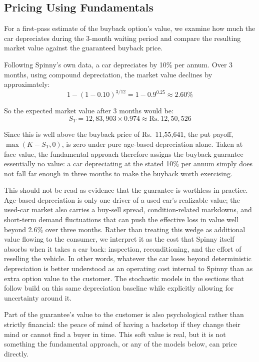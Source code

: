 \documentclass[11pt, a4paper]{article}
\begin{document}
\subsection{Pricing Using Fundamentals}
\label{sec:pricing_fundamental}

For a first-pass estimate of the buyback option's value, we examine how much the car depreciates during the 3-month waiting period and compare the resulting market value against the guaranteed buyback price.

Following Spinny's own data, a car depreciates by 10\% per annum. Over 3 months, using compound depreciation, the market value declines by approximately:
\[
1 - (1 - 0.10)^{3/12} = 1 - 0.9^{0.25} \approx 2.60\%
\]

So the expected market value after 3 months would be:
\[
S_T = 12{,}83{,}903 \times 0.974 \approx \text{Rs.}~12{,}50{,}526
\]

Since this is well above the buyback price of Rs.~11,55,641, the put payoff, $\max(K - S_T, 0)$, is zero under pure age-based depreciation alone. Taken at face value, the fundamental approach therefore assigns the buyback guarantee essentially no value: a car depreciating at the stated 10\% per annum simply does not fall far enough in three months to make the buyback worth exercising.

This should not be read as evidence that the guarantee is worthless in practice. Age-based depreciation is only one driver of a used car's realizable value; the used-car market also carries a buy-sell spread, condition-related markdowns, and short-term demand fluctuations that can push the effective loss in value well beyond 2.6\% over three months. Rather than treating this wedge as additional value flowing to the consumer, we interpret it as the cost that Spinny itself absorbs when it takes a car back: inspection, reconditioning, and the effort of reselling the vehicle. In other words, whatever the car loses beyond deterministic depreciation is better understood as an operating cost internal to Spinny than as extra option value to the customer. The stochastic models in the sections that follow build on this same depreciation baseline while explicitly allowing for uncertainty around it.

Part of the guarantee's value to the customer is also psychological rather than strictly financial: the peace of mind of having a backstop if they change their mind or cannot find a buyer in time. This soft value is real, but it is not something the fundamental approach, or any of the models below, can price directly.
\end{document}
